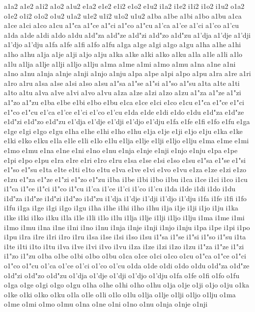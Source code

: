 a1a2
a1e2
a1i2
a1o2
a1u2
e1a2
e1e2
e1i2
e1o2
e1u2
i1a2
i1e2
i1i2
i1o2
i1u2
o1a2
o1e2
o1i2
o1o2
o1u2
u1a2
u1e2
u1i2
u1o2
u1u2
a1ba
a1be
a1bi
a1bo
a1bu
a1ca
a1ce
a1ci
a1co
a1cu
a1"ca
a1"ce
a1"ci
a1"co
a1"cu
a1'ca
a1'ce
a1'ci
a1'co
a1'cu
a1da
a1de
a1di
a1do
a1du
a1d"za
a1d"ze
a1d"zi
a1d"zo
a1d"zu
a1'dja
a1'dje
a1'dji
a1'djo
a1'dju
a1fa
a1fe
a1fi
a1fo
a1fu
a1ga
a1ge
a1gi
a1go
a1gu
a1ha
a1he
a1hi
a1ho
a1hu
a1ja
a1je
a1ji
a1jo
a1ju
a1ka
a1ke
a1ki
a1ko
a1ku
a1la
a1le
a1li
a1lo
a1lu
a1lja
a1lje
a1lji
a1ljo
a1lju
a1ma
a1me
a1mi
a1mo
a1mu
a1na
a1ne
a1ni
a1no
a1nu
a1nja
a1nje
a1nji
a1njo
a1nju
a1pa
a1pe
a1pi
a1po
a1pu
a1ra
a1re
a1ri
a1ro
a1ru
a1sa
a1se
a1si
a1so
a1su
a1"sa
a1"se
a1"si
a1"so
a1"su
a1ta
a1te
a1ti
a1to
a1tu
a1va
a1ve
a1vi
a1vo
a1vu
a1za
a1ze
a1zi
a1zo
a1zu
a1"za
a1"ze
a1"zi
a1"zo
a1"zu
e1ba
e1be
e1bi
e1bo
e1bu
e1ca
e1ce
e1ci
e1co
e1cu
e1"ca
e1"ce
e1"ci
e1"co
e1"cu
e1'ca
e1'ce
e1'ci
e1'co
e1'cu
e1da
e1de
e1di
e1do
e1du
e1d"za
e1d"ze
e1d"zi
e1d"zo
e1d"zu
e1'dja
e1'dje
e1'dji
e1'djo
e1'dju
e1fa
e1fe
e1fi
e1fo
e1fu
e1ga
e1ge
e1gi
e1go
e1gu
e1ha
e1he
e1hi
e1ho
e1hu
e1ja
e1je
e1ji
e1jo
e1ju
e1ka
e1ke
e1ki
e1ko
e1ku
e1la
e1le
e1li
e1lo
e1lu
e1lja
e1lje
e1lji
e1ljo
e1lju
e1ma
e1me
e1mi
e1mo
e1mu
e1na
e1ne
e1ni
e1no
e1nu
e1nja
e1nje
e1nji
e1njo
e1nju
e1pa
e1pe
e1pi
e1po
e1pu
e1ra
e1re
e1ri
e1ro
e1ru
e1sa
e1se
e1si
e1so
e1su
e1"sa
e1"se
e1"si
e1"so
e1"su
e1ta
e1te
e1ti
e1to
e1tu
e1va
e1ve
e1vi
e1vo
e1vu
e1za
e1ze
e1zi
e1zo
e1zu
e1"za
e1"ze
e1"zi
e1"zo
e1"zu
i1ba
i1be
i1bi
i1bo
i1bu
i1ca
i1ce
i1ci
i1co
i1cu
i1"ca
i1"ce
i1"ci
i1"co
i1"cu
i1'ca
i1'ce
i1'ci
i1'co
i1'cu
i1da
i1de
i1di
i1do
i1du
i1d"za
i1d"ze
i1d"zi
i1d"zo
i1d"zu
i1'dja
i1'dje
i1'dji
i1'djo
i1'dju
i1fa
i1fe
i1fi
i1fo
i1fu
i1ga
i1ge
i1gi
i1go
i1gu
i1ha
i1he
i1hi
i1ho
i1hu
i1ja
i1je
i1ji
i1jo
i1ju
i1ka
i1ke
i1ki
i1ko
i1ku
i1la
i1le
i1li
i1lo
i1lu
i1lja
i1lje
i1lji
i1ljo
i1lju
i1ma
i1me
i1mi
i1mo
i1mu
i1na
i1ne
i1ni
i1no
i1nu
i1nja
i1nje
i1nji
i1njo
i1nju
i1pa
i1pe
i1pi
i1po
i1pu
i1ra
i1re
i1ri
i1ro
i1ru
i1sa
i1se
i1si
i1so
i1su
i1"sa
i1"se
i1"si
i1"so
i1"su
i1ta
i1te
i1ti
i1to
i1tu
i1va
i1ve
i1vi
i1vo
i1vu
i1za
i1ze
i1zi
i1zo
i1zu
i1"za
i1"ze
i1"zi
i1"zo
i1"zu
o1ba
o1be
o1bi
o1bo
o1bu
o1ca
o1ce
o1ci
o1co
o1cu
o1"ca
o1"ce
o1"ci
o1"co
o1"cu
o1'ca
o1'ce
o1'ci
o1'co
o1'cu
o1da
o1de
o1di
o1do
o1du
o1d"za
o1d"ze
o1d"zi
o1d"zo
o1d"zu
o1'dja
o1'dje
o1'dji
o1'djo
o1'dju
o1fa
o1fe
o1fi
o1fo
o1fu
o1ga
o1ge
o1gi
o1go
o1gu
o1ha
o1he
o1hi
o1ho
o1hu
o1ja
o1je
o1ji
o1jo
o1ju
o1ka
o1ke
o1ki
o1ko
o1ku
o1la
o1le
o1li
o1lo
o1lu
o1lja
o1lje
o1lji
o1ljo
o1lju
o1ma
o1me
o1mi
o1mo
o1mu
o1na
o1ne
o1ni
o1no
o1nu
o1nja
o1nje
o1nji
